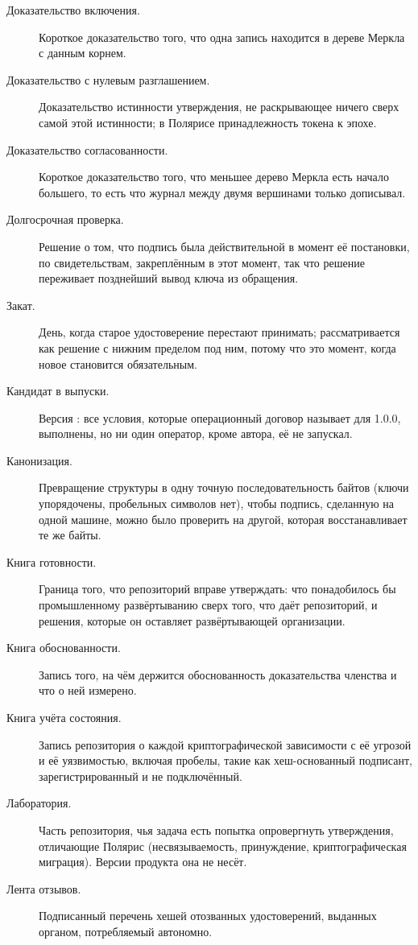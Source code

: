 \begin{description}
  \item[Доказательство включения.] Короткое доказательство того, что одна запись находится в дереве Меркла с данным корнем.
  \item[Доказательство с нулевым разглашением.] Доказательство истинности утверждения, не раскрывающее ничего сверх самой этой истинности; в Полярисе принадлежность токена к эпохе.
  \item[Доказательство согласованности.] Короткое доказательство того, что меньшее дерево Меркла есть начало большего, то есть что журнал между двумя вершинами только дописывал.
  \item[Долгосрочная проверка.] Решение о том, что подпись была действительной в момент её постановки, по свидетельствам, закреплённым в этот момент, так что решение переживает позднейший вывод ключа из обращения.
  \item[Закат.] День, когда старое удостоверение перестают принимать; рассматривается как решение с нижним пределом под ним, потому что это момент, когда новое становится обязательным.
  \item[Кандидат в выпуски.] Версия : все условия, которые операционный договор называет для 1.0.0, выполнены, но ни один оператор, кроме автора, её не запускал.
  \item[Канонизация.] Превращение структуры в одну точную последовательность байтов (ключи упорядочены, пробельных символов нет), чтобы подпись, сделанную на одной машине, можно было проверить на другой, которая восстанавливает те же байты.
  \item[Книга готовности.] Граница того, что репозиторий вправе утверждать: что понадобилось бы промышленному
    развёртыванию сверх того, что даёт репозиторий, и решения, которые он оставляет развёртывающей
    организации.
  \item[Книга обоснованности.] Запись того, на чём держится обоснованность доказательства членства и что о
    ней измерено.
  \item[Книга учёта состояния.] Запись репозитория о каждой криптографической зависимости с её угрозой и её
    уязвимостью, включая пробелы, такие как хеш-основанный подписант, зарегистрированный и не подключённый.
  \item[Лаборатория.] Часть репозитория, чья задача есть попытка опровергнуть утверждения, отличающие
    Полярис (несвязываемость, принуждение, криптографическая миграция). Версии продукта она не несёт.
  \item[Лента отзывов.] Подписанный перечень хешей отозванных удостоверений, выданных органом, потребляемый автономно.

\end{description}
